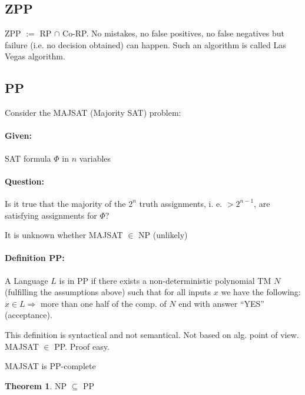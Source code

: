 \documentclass[11pt]{article}
\theoremstyle{definition}
\newtheorem{theorem}{Theorem}[section]
\theoremstyle{definition}
\begin{document}
\subsection{ZPP}
ZPP $ := $ RP $ \cap $ Co-RP. No mistakes, no false positives, no false negatives but failure (i.e. no decision obtained) can happen. Such an algorithm is called Las Vegas algorithm.

\subsection{PP}
Consider the MAJSAT (Majority SAT) problem:
\paragraph{Given:} SAT formula $ \Phi $ in $ n $ variables
\paragraph{Question:} Is it true that the majority of the $ 2^n $ truth assignments, i. e. $ > 2^{n-1} $, are satisfying assignments for $ \Phi $?

It is unknown whether MAJSAT $ \in $ NP (unlikely)

\paragraph{Definition PP:} A Language $ L $ is in PP if there exists a non-deterministic polynomial TM $ N $ (fulfilling the assumptions above) such that for all inputs $ x $ we have the following:
$ x \in L \Rightarrow $ more than one half of the comp. of $ N $ end with answer ``YES'' (acceptance).

This definition is syntactical and not semantical. Not based on alg. point of view. MAJSAT $ \in $ PP. Proof easy.

MAJSAT is PP-complete

\begin{theorem}

NP $ \subseteq $ PP

\end{theorem}

\end{document}
